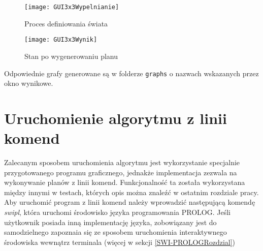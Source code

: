     \begin{figure}[H]
        \texttt{[image: GUI3x3Wypelnianie]}
        \centering
        \caption{Proces definiowania świata}
    \end{figure}

    \begin{figure}[H]
        \texttt{[image: GUI3x3Wynik]}
        \centering
        \caption{Stan po wygenerowaniu planu}
    \end{figure}

    Odpowiednie grafy generowane są w folderze \texttt{graphs} o nazwach wskazanych przez okno wynikowe.
\section{Uruchomienie algorytmu z linii komend}
    \label{CommandLine}
    Zalecanym sposobem uruchomienia algorytmu jest wykorzystanie specjalnie przygotowanego programu graficznego, jednakże implementacja zezwala na 
    wykonywanie planów z linii komend. Funkcjonalność ta została wykorzystana między innymi w testach, których opis można znaleźć w ostatnim rozdziale pracy.
    Aby uruchomić program z linii komend należy wprowadzić następującą komendę \textit{swipl}, która uruchomi środowisko języka programowania PROLOG.
    Jeśli użytkownik posiada inną implementację języka, zobowiązany jest do samodzielnego zapoznaia się ze sposobem uruchomienia interaktywnego 
    środowiska wewnątrz terminala (więcej w sekcji \ref{SWI-PROLOGRozdzial})

